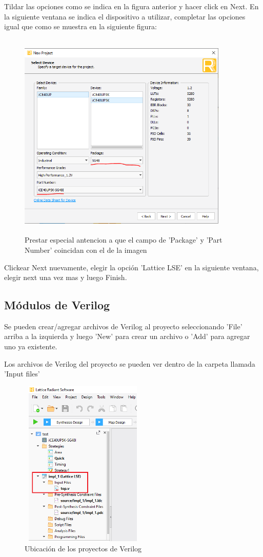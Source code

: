 \documentclass{article}
\begin{document}
	Tildar las opciones como se indica en la figura anterior y hacer click en Next.
	En la siguiente ventana se indica el dispositivo a utilizar, completar las opciones igual que como se muestra en la siguiente figura:
	\begin{figure}[H]
	\centering
	\includegraphics[height=10cm,width=10cm]{Imagenes/Dispositivo.png}
	\caption{Prestar especial antencion a que el campo de 'Package' y 'Part Number' coincidan con el de la imagen }
	\end{figure}
	Clickear Next nuevamente, elegir la opción 'Lattice LSE' en la siguiente ventana, elegir next una vez mas y luego Finish.
	

\subsection{Módulos de Verilog}
Se pueden crear/agregar archivos de Verilog al proyecto seleccionando 'File' arriba a la izquierda y luego 'New' para crear un archivo o 'Add' para agregar uno ya existente.

Los archivos de Verilog del proyecto se pueden ver dentro de la carpeta llamada 'Input files'
\begin{figure}[H]
	\centering
	\includegraphics[height=8cm,width=6cm]{Imagenes/VerilogArch.png}
	\caption{Ubicación de los proyectos de Verilog}
	\end{figure}
\end{document}
